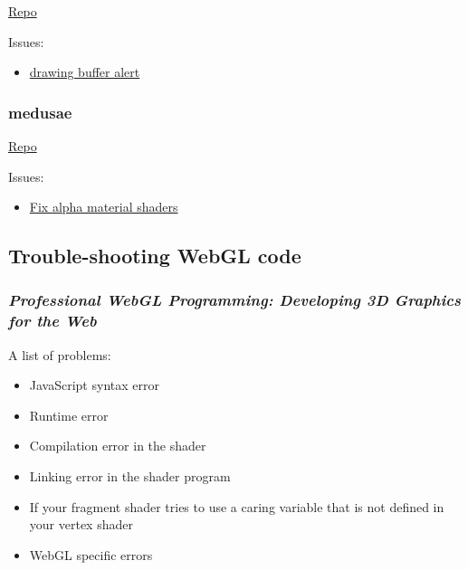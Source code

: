 \documentclass[]{article}
\begin{document}
\href{https://github.com/ondras/fireworks-webgl/}{Repo}

Issues:

\begin{itemize}
\itemsep1pt\parskip0pt
\item
  \href{https://github.com/ondras/fireworks-webgl/commit/993566ae843d0d8882a9173614258a86aacdcd9a}{drawing
  buffer alert}
\end{itemize}

\subsubsection{medusae}\label{medusae}

\href{https://github.com/jpweeks/particulate-medusae}{Repo}

Issues:

\begin{itemize}
\itemsep1pt\parskip0pt
\item
  \href{https://github.com/jpweeks/particulate-medusae/commit/6ef54b1d5cc370a91be98ff30d66261059546d3e}{Fix
  alpha material shaders}
\end{itemize}

\subsection{Trouble-shooting WebGL
code}\label{trouble-shooting-webgl-code}

\subsubsection{\emph{Professional WebGL Programming: Developing 3D
Graphics for the
Web}}\label{professional-webgl-programming-developing-3d-graphics-for-the-web}

A list of problems:

\begin{itemize}
\itemsep1pt\parskip0pt
\item
  JavaScript syntax error
\item
  Runtime error
\item
  Compilation error in the shader
\item
  Linking error in the shader program
\item
  If your fragment shader tries to use a caring variable that is not
  defined in your vertex shader
\item
  WebGL specific errors
\end{itemize}
\end{document}
